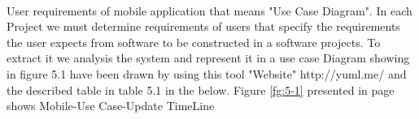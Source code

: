 \documentclass[12pt,a4paper,class,twoside,openany]{report}
\begin{document}
{ \paragraph*{\hspace{.9 cm} } User requirements of mobile application that means "Use Case Diagram".  In each Project we must determine requirements of users that specify the requirements the user expects from software to be constructed in a software projects. To extract it we analysis the system and represent it in a use case Diagram showing in figure 5.1 have been drawn by using this tool "Website" http://yuml.me/  and the described table in table 5.1 in the below. 
 Figure \ref{fg:5-1} presented in page \pageref{fg:5-1}shows Mobile-Use Case-Update TimeLine
\begin{figure}
\begin{center}
\end{center}
\end{figure}}
\end{document}
